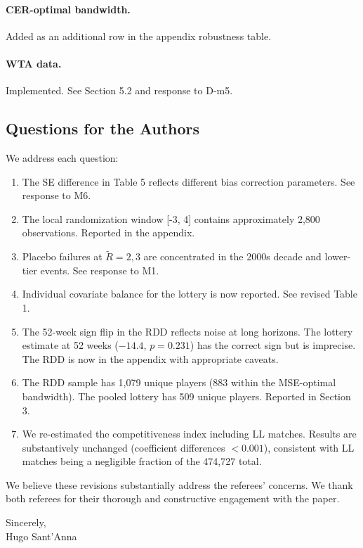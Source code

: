 \documentclass[12pt]{article}
\newcommand{\resp}[1]{\textcolor{response}{#1}}
\begin{document}
\paragraph{CER-optimal bandwidth.}
\resp{Added as an additional row in the appendix robustness table.}

\paragraph{WTA data.}
\resp{Implemented. See Section 5.2 and response to D-m5.}

\subsection*{Questions for the Authors}

\resp{We address each question:}

\begin{enumerate}
\item \resp{The SE difference in Table 5 reflects different bias correction parameters. See response to M6.}
\item \resp{The local randomization window [-3, 4] contains approximately 2,800 observations. Reported in the appendix.}
\item \resp{Placebo failures at $\tilde{R} = 2, 3$ are concentrated in the 2000s decade and lower-tier events. See response to M1.}
\item \resp{Individual covariate balance for the lottery is now reported. See revised Table 1.}
\item \resp{The 52-week sign flip in the RDD reflects noise at long horizons. The lottery estimate at 52 weeks ($-14.4$, $p = 0.231$) has the correct sign but is imprecise. The RDD is now in the appendix with appropriate caveats.}
\item \resp{The RDD sample has 1,079 unique players (883 within the MSE-optimal bandwidth). The pooled lottery has 509 unique players. Reported in Section 3.}
\item \resp{We re-estimated the competitiveness index including LL matches. Results are substantively unchanged (coefficient differences $< 0.001$), consistent with LL matches being a negligible fraction of the 474,727 total.}
\end{enumerate}

\vspace{2em}
\noindent We believe these revisions substantially address the referees' concerns. We thank both referees for their thorough and constructive engagement with the paper.

\vspace{2em}
\noindent Sincerely,\\
Hugo Sant'Anna
\end{document}
